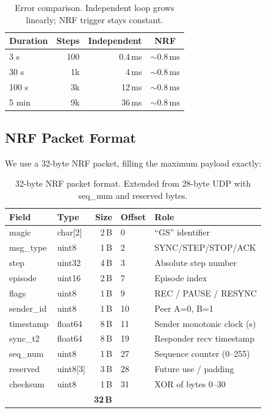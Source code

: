 \documentclass[11pt,a4paper]{article}
\begin{document}
\begin{table}[htbp]
\centering
\caption{Error comparison. Independent loop grows linearly; NRF trigger stays constant.}
\begin{tabular}{l r r c}
\toprule
\textbf{Duration} & \textbf{Steps} & \textbf{Independent} & \textbf{NRF} \\
\midrule
3 s & 100 & 0.4\,ms & ${\sim}$0.8\,ms \\
30 s & 1k & 4\,ms & ${\sim}$0.8\,ms \\
100 s & 3k & 12\,ms & ${\sim}$0.8\,ms \\
5 min & 9k & 36\,ms & ${\sim}$0.8\,ms \\
\bottomrule
\end{tabular}
\label{tab:error-compare}
\end{table}

\subsection{NRF Packet Format}

We use a 32-byte NRF packet, filling the maximum payload exactly:

\begin{table}[htbp]
\centering
\caption{32-byte NRF packet format. Extended from 28-byte UDP with seq\_num and reserved bytes.}
\begin{tabular}{l l r l l}
\toprule
\textbf{Field} & \textbf{Type} & \textbf{Size} & \textbf{Offset} & \textbf{Role} \\
\midrule
magic & char[2] & 2\,B & 0 & ``GS'' identifier \\
msg\_type & uint8 & 1\,B & 2 & SYNC/STEP/STOP/ACK \\
step & uint32 & 4\,B & 3 & Absolute step number \\
episode & uint16 & 2\,B & 7 & Episode index \\
flags & uint8 & 1\,B & 9 & REC / PAUSE / RESYNC \\
sender\_id & uint8 & 1\,B & 10 & Peer A=0, B=1 \\
timestamp & float64 & 8\,B & 11 & Sender monotonic clock (s) \\
sync\_t2 & float64 & 8\,B & 19 & Responder recv timestamp \\
seq\_num & uint8 & 1\,B & 27 & Sequence counter (0--255) \\
reserved & uint8[3] & 3\,B & 28 & Future use / padding \\
checksum & uint8 & 1\,B & 31 & XOR of bytes 0--30 \\
\midrule
 & & \textbf{32\,B} & & \\
\bottomrule
\end{tabular}
\label{tab:nrf-packet}
\end{table}
\end{document}
